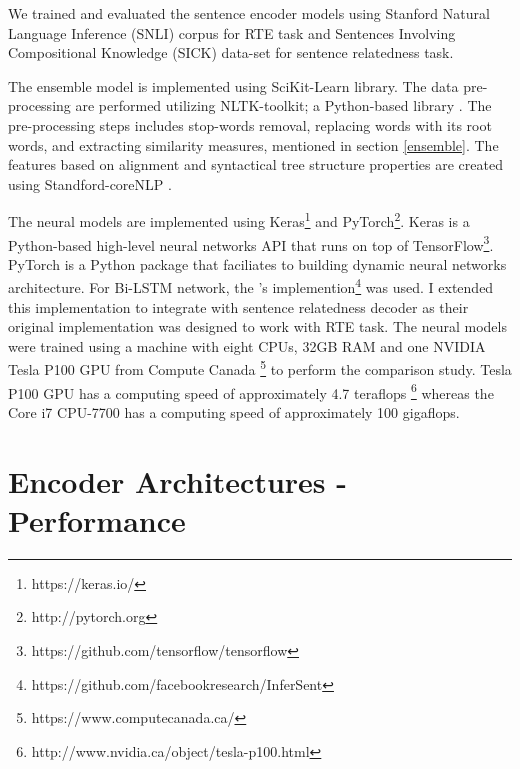 \documentclass[12pt]{report} %
\begin{document}
  We trained and evaluated the sentence encoder models using Stanford Natural Language Inference (SNLI) corpus \citep{bowman2015large} for RTE task and Sentences Involving Compositional Knowledge (SICK) \citep{marelli2014semeval} data-set for sentence relatedness task. 
 
  The ensemble model is implemented using SciKit-Learn library. The data pre-processing are performed utilizing NLTK-toolkit; a Python-based library \citep{bird2004nltk}. The pre-processing steps includes stop-words removal, replacing words with its root words, and extracting similarity measures, mentioned in section \ref{ensemble}. The features based on alignment and syntactical tree structure properties are created using Standford-coreNLP \citep{manning2014stanford}. 
  
   The neural models are implemented using Keras\footnote{https://keras.io/} and PyTorch\footnote{http://pytorch.org}. Keras is a Python-based high-level neural networks API that runs on top of TensorFlow\footnote{https://github.com/tensorflow/tensorflow}. PyTorch is a Python package that faciliates to building dynamic neural networks architecture. For Bi-LSTM network, the \cite{conneau2017supervised}'s implemention\footnote{https://github.com/facebookresearch/InferSent} was used. I extended this implementation to integrate with sentence relatedness decoder as their original implementation was designed to work with RTE task. The neural models were trained using a machine with eight CPUs, 32GB RAM and one NVIDIA Tesla P100 GPU from Compute Canada \footnote{https://www.computecanada.ca/} to perform the comparison study. Tesla P100 GPU has a computing speed of  approximately 4.7 teraflops \footnote{http://www.nvidia.ca/object/tesla-p100.html} whereas the Core i7 CPU-7700 has a computing speed of approximately 100 gigaflops.
 
 
 


\section{Encoder Architectures - Performance}
\end{document}
